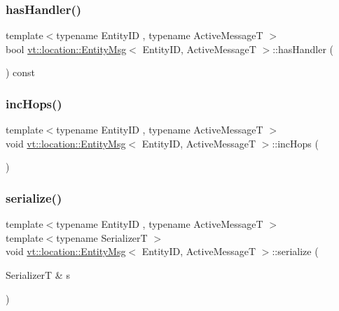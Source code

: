 \subsubsection{\texorpdfstring{has\+Handler()}{hasHandler()}}
{\footnotesize\ttfamily template$<$typename Entity\+ID , typename Active\+MessageT $>$ \\
bool \hyperlink{structvt_1_1location_1_1_entity_msg}{vt\+::location\+::\+Entity\+Msg}$<$ Entity\+ID, Active\+MessageT $>$\+::has\+Handler (\begin{DoxyParamCaption}{ }\end{DoxyParamCaption}) const\hspace{0.3cm}{\ttfamily [inline]}}

\mbox{\label{structvt_1_1location_1_1_entity_msg_a2bd45f682dbeb4f6a39ded357483012b}} 
\subsubsection{\texorpdfstring{inc\+Hops()}{incHops()}}
{\footnotesize\ttfamily template$<$typename Entity\+ID , typename Active\+MessageT $>$ \\
void \hyperlink{structvt_1_1location_1_1_entity_msg}{vt\+::location\+::\+Entity\+Msg}$<$ Entity\+ID, Active\+MessageT $>$\+::inc\+Hops (\begin{DoxyParamCaption}{ }\end{DoxyParamCaption})\hspace{0.3cm}{\ttfamily [inline]}}

\mbox{\label{structvt_1_1location_1_1_entity_msg_a203b07e756313743e7258b8b1dbcb527}} 
\subsubsection{\texorpdfstring{serialize()}{serialize()}}
{\footnotesize\ttfamily template$<$typename Entity\+ID , typename Active\+MessageT $>$ \\
template$<$typename SerializerT $>$ \\
void \hyperlink{structvt_1_1location_1_1_entity_msg}{vt\+::location\+::\+Entity\+Msg}$<$ Entity\+ID, Active\+MessageT $>$\+::serialize (\begin{DoxyParamCaption}\item[{SerializerT \&}]{s }\end{DoxyParamCaption})\hspace{0.3cm}{\ttfamily [inline]}}


